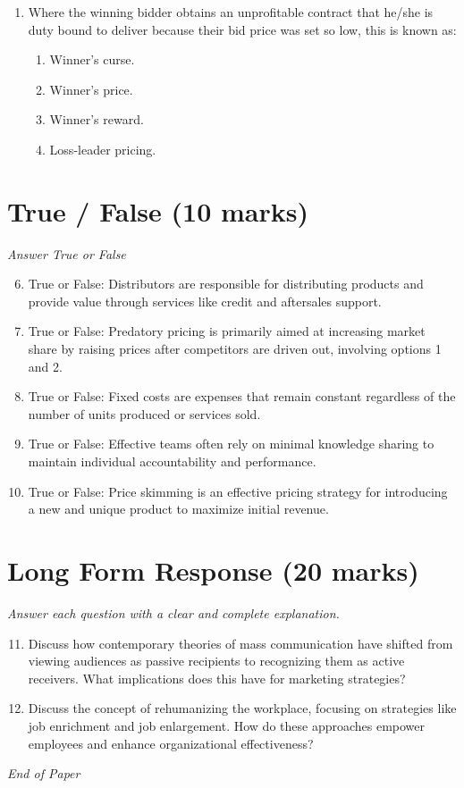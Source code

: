 \documentclass[12pt]{article}
\begin{document}
\begin{enumerate}[label=\arabic*.]
\begin{enumerate}[label=(\alph*)]
    \item Shaper
    \item Resource investigator
    \item Implementer
\end{enumerate}
\item Where the winning bidder obtains an unprofitable contract that he/she is duty bound to deliver because their bid price was set so low, this is known as:
\begin{enumerate}[label=(\alph*)]
    \item Winner's curse.
    \item Winner's price.
    \item Winner's reward.
    \item Loss-leader pricing.
\end{enumerate}
\end{enumerate}

\section*{True / False (10 marks)}
\textit{Answer True or False}
\begin{enumerate}[label=\arabic*.]
\setcounter{enumi}{5}
\item True or False: Distributors are responsible for distributing products and provide value through services like credit and aftersales support.
\item True or False: Predatory pricing is primarily aimed at increasing market share by raising prices after competitors are driven out, involving options 1 and 2.
\item True or False: Fixed costs are expenses that remain constant regardless of the number of units produced or services sold.
\item True or False: Effective teams often rely on minimal knowledge sharing to maintain individual accountability and performance.
\item True or False: Price skimming is an effective pricing strategy for introducing a new and unique product to maximize initial revenue.
\end{enumerate}

\section*{Long Form Response (20 marks)}
\textit{Answer each question with a clear and complete explanation.}
\begin{enumerate}[label=\arabic*.]
\setcounter{enumi}{10}
\item Discuss how contemporary theories of mass communication have shifted from viewing audiences as passive recipients to recognizing them as active receivers. What implications does this have for marketing strategies?
\item Discuss the concept of rehumanizing the workplace, focusing on strategies like job enrichment and job enlargement. How do these approaches empower employees and enhance organizational effectiveness?
\end{enumerate}

\vfill
\noindent\textit{End of Paper}
\end{document}
